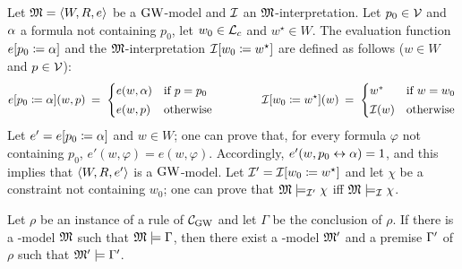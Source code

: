 Let $\mathfrak{M}=\langle W,R,e \rangle$ be a $\mbox{$\mathrm{GW}$}$-model and  $\mathcal{I}$  an $\mathfrak{M}$-interpretation.
Let $p_0 \in \mathcal{V}$ and $\alpha$  a formula not containing $p_0$, let $w_0\in\mathcal{L}_c$  and   $w^\star\in W$.
The evaluation function   $e[p_0 \coloneqq \alpha]$   and the  $\mathfrak{M}$-interpretation  $\mathcal{I}[w_0 \coloneqq w^\star]$
are defined as follows ($w\in W$ and $p\in\mathcal{V}$):
\[
e[p_0 \coloneqq \alpha](w,p)\:=\;
  \begin{cases}
  e(w,\alpha) &\text{if $p=p_0$}  
 \\[0.5ex]
 e(w,p) &\text{otherwise}   
  \end{cases}
\hspace{4em}
  \mathcal{I}[w_0 \coloneqq w^\star](w) \:=\;
  \begin{cases}
  w^* &\text{if $w=w_0$}  
 \\[0.5ex]
 \mathcal{I}(w) &\text{otherwise}   
  \end{cases}
\]
Let $e'=e[p_0 \coloneqq \alpha]$ and $w\in W$; one can prove that, for
every formula $\varphi$ not containing $p_0$,
$e'(w,\varphi)=e(w,\varphi)$. Accordingly, $e'(w,p_0\leftrightarrow \alpha)=1$, and
this implies that $\langle W,R,e' \rangle$ is a $\mbox{$\mathrm{GW}$}$-model.  Let
$\mathcal{I}'=\mathcal{I}[w_0 \coloneqq w^\star]$ and let $\chi$ be a constraint
not containing $w_0$; one can prove that $\mathfrak{M}\models_{\mathcal{I}'}\chi$ iff
$\mathfrak{M}\models_{\mathcal{I}}\chi$.




\begin{lemma}\label{lemma:soundRule}
  Let $\rho$ be an instance of a rule of $\mathcal{C}_{\mathrm{GW}}$ and 
 let $\Gamma$  be the conclusion of $\rho$. If there is  a \GWM-model $\mathfrak{M}$
 such that $\mathfrak{M}\models\Gamma$, then there exist a
\GWM-model $\mathfrak{M}'$ and a   premise $\Gamma'$ of $\rho$
  such that $\mathfrak{M}'\models\Gamma'$.
\end{lemma}

